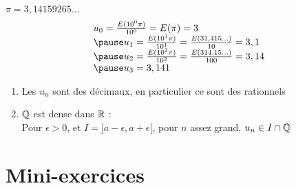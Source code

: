 \begin{frame}
\begin{exemple} 
\hfil\hfil$\pi= 3,14159265\ldots$
\pause
\renewcommand{\arraystretch}{1.8}
 $$ \begin{array}{l}    
    u_0  = \frac{E(10^0\pi)}{10^0}  = E(\pi) = 3\\
\pause
    u_1  = \frac{E(10^1\pi)}{10^1}  = \frac{E(31,415\ldots)}{10}  = 3,1\\
\pause    
    u_2  = \frac{E(10^2\pi)}{10^2}  = \frac{E(314,15\ldots)}{100} = 3,14\\
\pause    
    u_3  = 3,141
  \end{array}$$
\end{exemple}
\pause


  \begin{enumerate}
    \item Les $u_n$ sont des décimaux, en particulier ce sont des rationnels
\pause
\medskip
    \item $\mathbb{Q}$ est dense dans $\mathbb{R}$ : \\
Pour $\epsilon >0$, et $I=]a-\epsilon,a+\epsilon[$, pour $n$ assez grand, $u_n\in I\cap \mathbb{Q}$
  \end{enumerate}


\end{frame}



\section{Mini-exercices}

